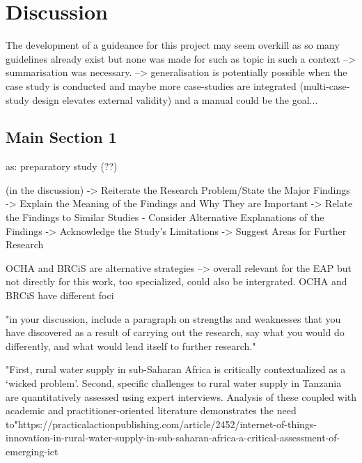 
\chapter{Discussion} %

\label{Chapter5} %


The development of a guideance for this project may seem overkill as so many guidelines already exist but none was made for such as topic in such a context --> summarisation was necessary. --> generalisation is potentially possible when the case study is conducted and maybe more case-studies are integrated (multi-case-study design elevates external validity) and a manual could be the goal... 


\section{Main Section 1}
as: preparatory study (??)


(in the discussion)
-> Reiterate the Research Problem/State the Major Findings
-> Explain the Meaning of the Findings and Why They are Important
-> Relate the Findings to Similar Studies
- Consider Alternative Explanations of the Findings
-> Acknowledge the Study's Limitations
-> Suggest Areas for Further Research


OCHA and BRCiS are alternative strategies --> overall relevant for the EAP but not directly for this work, too specialized, could also be intergrated. OCHA and BRCiS have different foci

"in your discussion, include a paragraph on strengths and weaknesses that you have discovered as a result of carrying out the research, say what you would do differently, and what would lend itself to further research."



"First, rural water supply in sub-Saharan Africa is critically contextualized as a ‘wicked problem’. Second, specific challenges to rural water supply in Tanzania are quantitatively assessed using expert interviews. Analysis of these coupled with academic and practitioner-oriented literature demonstrates the need to"https://practicalactionpublishing.com/article/2452/internet-of-things-innovation-in-rural-water-supply-in-sub-saharan-africa-a-critical-assessment-of-emerging-ict


